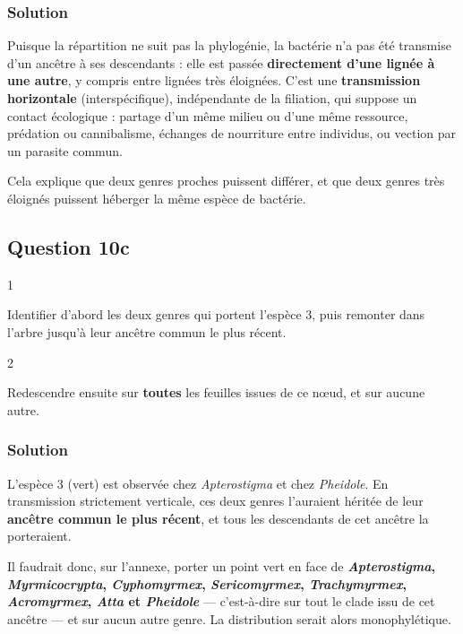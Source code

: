 \documentclass[11pt,a4paper]{article}
\begin{document}
\hypertarget{solution-64}{%
\subsubsection{Solution}\label{solution-64}}

Puisque la répartition ne suit pas la phylogénie, la bactérie n'a pas été transmise d'un ancêtre à ses descendants : elle est passée \textbf{directement d'une lignée à une autre}, y compris entre lignées très éloignées. C'est une \textbf{transmission horizontale} (interspécifique), indépendante de la filiation, qui suppose un contact écologique : partage d'un même milieu ou d'une même ressource, prédation ou cannibalisme, échanges de nourriture entre individus, ou vection par un parasite commun.

Cela explique que deux genres proches puissent différer, et que deux genres très éloignés puissent héberger la même espèce de bactérie.

\hypertarget{question-10c}{%
\subsection{Question 10c}\label{question-10c}}

\begin{indication}{1}

Identifier d'abord les deux genres qui portent l'espèce 3, puis remonter dans l'arbre jusqu'à leur ancêtre commun le plus récent.

\end{indication}

\begin{indication}{2}

Redescendre ensuite sur \textbf{toutes} les feuilles issues de ce nœud, et sur aucune autre.

\end{indication}

\hypertarget{solution-65}{%
\subsubsection{Solution}\label{solution-65}}

L'espèce 3 (vert) est observée chez \emph{Apterostigma} et chez \emph{Pheidole}. En transmission strictement verticale, ces deux genres l'auraient héritée de leur \textbf{ancêtre commun le plus récent}, et tous les descendants de cet ancêtre la porteraient.

Il faudrait donc, sur l'annexe, porter un point vert en face de \textbf{\emph{Apterostigma}, \emph{Myrmicocrypta}, \emph{Cyphomyrmex}, \emph{Sericomyrmex}, \emph{Trachymyrmex}, \emph{Acromyrmex}, \emph{Atta} et \emph{Pheidole}} --- c'est-à-dire sur tout le clade issu de cet ancêtre --- et sur aucun autre genre. La distribution serait alors monophylétique.
\end{document}
